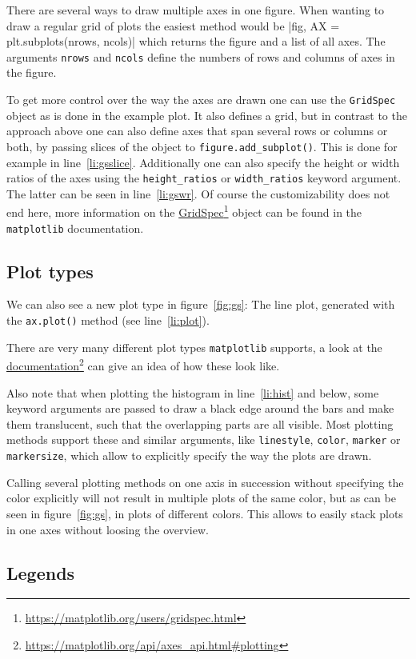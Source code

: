 \documentclass[a4paper, 11pt, onecolumn]{article}
\newcommand{\mpl}{\texttt{matplotlib}\xspace}
\newcommand{\pl}[1]{\mbox{\texttt{#1}\xspace}}
\newcommand{\fref}[2]{\href{#1}{#2}\footnote{\url{#1}}}
\newcommand{\baseref}[3]{\mbox{#1 \ref{#2:#3}\xspace}}
\newcommand{\fig}[1]{\baseref{figure}{fig}{#1}}
\newcommand{\lin}[1]{\baseref{line}{li}{#1}}
\begin{document}
There are several ways to draw multiple axes in one figure. When wanting to
draw a regular grid of plots the easiest method would be
|fig, AX = plt.subplots(nrows, ncols)|
which returns the figure and a list of all axes. The arguments \pl{nrows} and 
\pl{ncols} define the numbers of rows and columns of axes in the figure.

To get more control over the way the axes are drawn one can use the
\pl{GridSpec} object as is done in the example plot. It also defines a grid,
but in contrast to the approach above one can also define axes that span
several rows or columns or both, by passing slices of the object to
\pl{figure.add\_subplot()}. This is done for example in \lin{gsslice}.
Additionally one can also specify the height or width ratios of the axes using
the \pl{height\_ratios} or \pl{width\_ratios} keyword argument. The latter can
be seen in \lin{gswr}. Of course the customizability does not end here,
more information on the
\fref{https://matplotlib.org/users/gridspec.html}{GridSpec} object can be found
in the \mpl documentation.


\subsection{Plot types}

We can also see a new plot type in \fig{gs}: The line plot, generated
with the \pl{ax.plot()} method (see \lin{plot}).

There are very many different plot types \mpl supports, a look at the
\fref{https://matplotlib.org/api/axes\_api.html\#plotting}{documentation} can
give an idea of how these look like.

Also note that when plotting the histogram in \lin{hist} and below, some
keyword arguments are passed to draw a black edge around the bars and make them
translucent, such that the overlapping parts are all visible. Most plotting
methods support these and similar arguments, like \pl{linestyle}, \pl{color},
\pl{marker} or \pl{markersize}, which allow to explicitly specify the way the
plots are drawn.

Calling several plotting methods on one axis in succession without specifying
the color explicitly will not result in multiple plots of the same color, but
as can be seen in \fig{gs}, in plots of different colors. This allows to easily
stack plots in one axes without loosing the overview.

\subsection{Legends}
\end{document}

